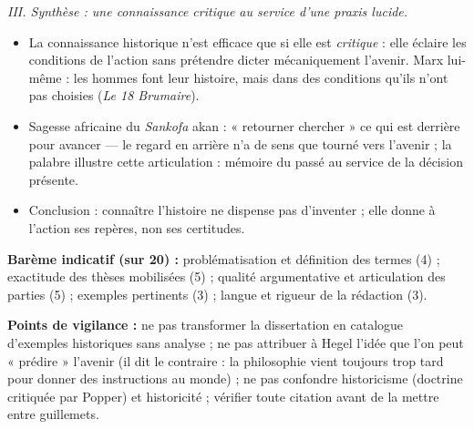 \documentclass[11pt]{article}
\begin{document}
\begin{corrige}
\emph{III. Synthèse : une connaissance critique au service d'une praxis lucide.}
\begin{itemize}
\item La connaissance historique n'est efficace que si elle est \emph{critique} : elle éclaire les conditions de l'action sans prétendre dicter mécaniquement l'avenir. Marx lui-même : les hommes font leur histoire, mais dans des conditions qu'ils n'ont pas choisies (\emph{Le 18 Brumaire}).
\item Sagesse africaine du \emph{Sankofa} akan : « retourner chercher » ce qui est derrière pour avancer — le regard en arrière n'a de sens que tourné vers l'avenir ; la palabre illustre cette articulation : mémoire du passé au service de la décision présente.
\item Conclusion : connaître l'histoire ne dispense pas d'inventer ; elle donne à l'action ses repères, non ses certitudes.
\end{itemize}

\textbf{Barème indicatif (sur 20) :} problématisation et définition des termes (4) ; exactitude des thèses mobilisées (5) ; qualité argumentative et articulation des parties (5) ; exemples pertinents (3) ; langue et rigueur de la rédaction (3).

\textbf{Points de vigilance :} ne pas transformer la dissertation en catalogue d'exemples historiques sans analyse ; ne pas attribuer à Hegel l'idée que l'on peut « prédire » l'avenir (il dit le contraire : la philosophie vient toujours trop tard pour donner des instructions au monde) ; ne pas confondre historicisme (doctrine critiquée par Popper) et historicité ; vérifier toute citation avant de la mettre entre guillemets.
\end{corrige}
\end{document}
